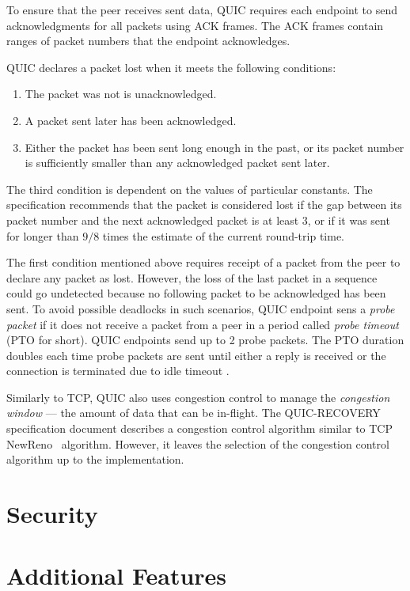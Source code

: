 To ensure that the peer receives sent data, QUIC requires each endpoint to send acknowledgments for
all packets using ACK frames. The ACK frames contain ranges of packet numbers that the endpoint
acknowledges.

QUIC declares a packet lost when it meets the following conditions:

\begin{enumerate}

  \item The packet was not is unacknowledged.

  \item A packet sent later has been acknowledged.

  \item Either the packet has been sent long enough in the past, or its packet number is
sufficiently smaller than any acknowledged packet sent later.

\end{enumerate}

The third condition is dependent on the values of particular constants. The specification recommends
that the packet is considered lost if the gap between its packet number and the next acknowledged
packet is at least 3, or if it was sent for longer than $9/8$ times the estimate of the current
round-trip time.

The first condition mentioned above requires receipt of a packet from the peer to declare any packet
as lost. However, the loss of the last packet in a sequence could go undetected because no following
packet to be acknowledged has been sent. To avoid possible deadlocks in such scenarios, QUIC
endpoint sens a \textit{probe packet} if it does not receive a packet from a peer in a period called
\textit{probe timeout} (PTO for short). QUIC endpoints send up to 2 probe packets. The PTO duration
doubles each time probe packets are sent until either a reply is received or the connection is
terminated due to idle timeout .

Similarly to TCP, QUIC also uses congestion control to manage the \textit{congestion window} --- the
amount of data that can be in-flight. The QUIC-RECOVERY specification document describes a
congestion control algorithm similar to TCP NewReno~\cite{rfc6582} algorithm. However, it leaves the
selection of the congestion control algorithm up to the implementation.

\section{Security}

\section{Additional Features}

